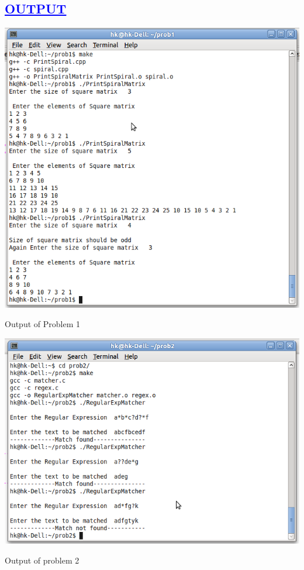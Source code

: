 \documentclass[a4paper,12pt]{report}
\begin{document}
\begin{center}
\chapter{\textcolor{blue}{\underline {OUTPUT}}}

 \includegraphics[width=13 cm,height=13 cm]{./output1.png}

Output of Problem 1
\end{center}
\begin{center}
 \includegraphics[width=13 cm,height=13 cm]{.//output2.png}

Output of problem 2
\end{center}
\end{document}
